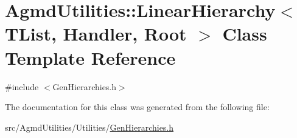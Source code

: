 \hypertarget{class_agmd_utilities_1_1_linear_hierarchy}{\section{Agmd\+Utilities\+:\+:Linear\+Hierarchy$<$ T\+List, Handler, Root $>$ Class Template Reference}
\label{class_agmd_utilities_1_1_linear_hierarchy}
}


{\ttfamily \#include $<$Gen\+Hierarchies.\+h$>$}



The documentation for this class was generated from the following file\+:\begin{DoxyCompactItemize}
\item 
src/\+Agmd\+Utilities/\+Utilities/\hyperlink{_gen_hierarchies_8h}{Gen\+Hierarchies.\+h}\end{DoxyCompactItemize}
